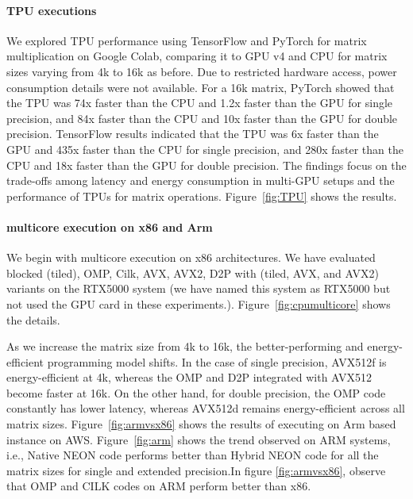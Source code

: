 \paragraph{TPU executions}
We explored TPU performance using TensorFlow and PyTorch for matrix multiplication on Google Colab, comparing it to GPU v4 and CPU for matrix sizes varying from 4k to 16k as before. Due to restricted hardware access, power consumption details were not available. For a 16k matrix, PyTorch showed that the TPU was 74x faster than the CPU and 1.2x faster than the GPU for single precision, and 84x faster than the CPU and 10x faster than the GPU for double precision. TensorFlow results indicated that the TPU was 6x faster than the GPU and 435x faster than the CPU for single precision, and 280x faster than the CPU and 18x faster than the GPU for double precision. The findings focus on  the trade-offs among latency and energy consumption in multi-GPU setups and the performance of TPUs for  matrix operations. Figure~\ref{fig:TPU} shows the results.

\paragraph{multicore execution on x86 and Arm}
We begin with multicore execution on x86 architectures. We have evaluated blocked (tiled), OMP, Cilk, AVX, AVX2, D2P with (tiled, AVX, and AVX2) variants on the RTX5000 system (we have named this system as RTX5000 but not used the GPU card in these experiments.). Figure~\ref{fig:cpumulticore} shows the details. 

As we increase the matrix size from 4k to 16k, the better-performing and energy-efficient programming model shifts. In the case of single precision, AVX512f is energy-efficient at 4k, whereas the OMP and D2P integrated with AVX512 become faster at 16k. On the other hand, for double precision, the OMP code constantly has lower latency, whereas  AVX512d remains energy-efficient across all matrix sizes. Figure~\ref{fig:armvsx86} shows the results of executing on Arm based instance on AWS. Figure~\ref{fig:arm} shows the trend observed on ARM systems, i.e., Native NEON code performs better than Hybrid NEON code for all the matrix sizes for single and extended precision.In figure \ref{fig:armvsx86}, observe that OMP and CILK codes on ARM perform better than x86.

